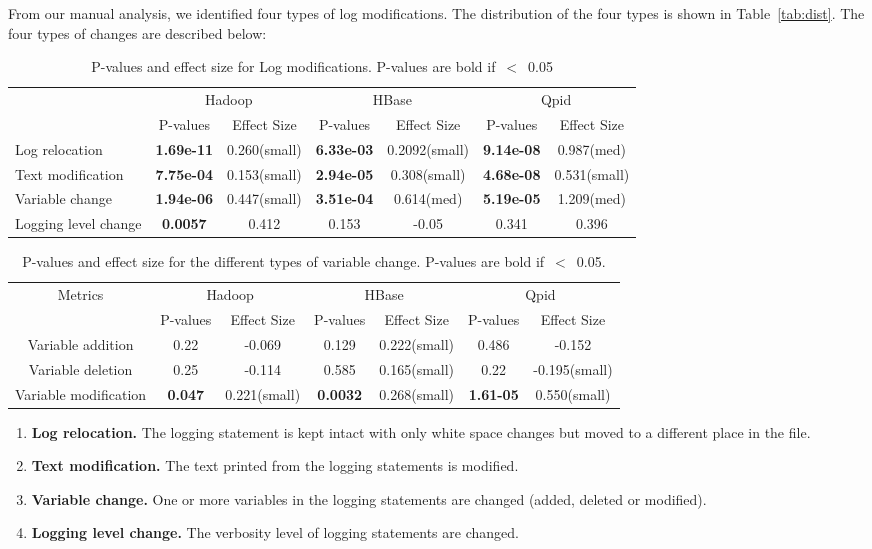\documentclass[conference]{IEEEtran}
\begin{document}
From our manual analysis, we identified four types of log modifications. The distribution of the four types is shown in Table~\ref{tab:dist}. The four types of changes are described below:
\begin{table}
	\protect\caption{P-values and effect size for Log modifications. P-values are bold if~$<$~0.05 }
	\label{tab:logmod}
	\centering{}%
	\begin{tabular}{|>{\centering}m{5cm}|c|c|c|c|c|c|}
		\hline 
		\multirow{2}{*}{Metrics}& \multicolumn{2}{c|}{Hadoop} & \multicolumn{2}{c|}{HBase} & \multicolumn{2}{c|}{Qpid}\tabularnewline
		\cline{2-7} 
		& P-values  & Effect Size & P-values  & Effect Size & P-values  & Effect Size\tabularnewline
		\hline 
		Log relocation & \textbf{1.69e-11} & 0.260(small) & \textbf{6.33e-03} & 0.2092(small) & \textbf{9.14e-08} & 0.987(med)\tabularnewline
		\hline 
		Text modification & \textbf{7.75e-04} & 0.153(small) & \textbf{2.94e-05} & 0.308(small) & \textbf{4.68e-08} & 0.531(small)\tabularnewline
		\hline 
		Variable change  & \textbf{1.94e-06} & 0.447(small) & \textbf{3.51e-04} & 0.614(med) & \textbf{5.19e-05} & 1.209(med)\tabularnewline
		\hline 
		Logging level change & \textbf{0.0057} & 0.412 & 0.153 & -0.05 & 0.341 & 0.396\tabularnewline
		\hline 
	\end{tabular}
\end{table}
\begin{table}[tbh]
	\caption{P-values and effect size for the different types of variable change. P-values are bold if~$<$~0.05.}
	\label{tab:varmod}
	\centering
	\begin{tabular}{|c|c|c|c|c|c|c|}
		\hline 
		\multirow{2}{*}{Metrics}& \multicolumn{2}{c|}{Hadoop} & \multicolumn{2}{c|}{HBase} & \multicolumn{2}{c|}{Qpid}\tabularnewline
		\cline{2-7} 
		& P-values  & Effect Size & P-values  & Effect Size & P-values  & Effect Size\tabularnewline
		\hline  Variable addition & 0.22  & -0.069  & 0.129 & 0.222(small) & 0.486 & -0.152 \\ 
		\hline  Variable deletion & 0.25 &   -0.114 & 0.585 &  0.165(small)  & 0.22 & -0.195(small)  \\ 
		\hline Variable modification & \textbf{0.047} &0.221(small)  & \textbf{0.0032} & 0.268(small) & \textbf{1.61-05} & 0.550(small)   \\ 
		\hline 
	\end{tabular} 
\end{table}
\begin{enumerate}
	\item \textbf{Log relocation.} The logging statement is kept intact with only white space changes but moved to a different place in the file.
	\item \textbf{Text modification.} The text printed from the logging statements is modified.
	\item \textbf{Variable change.} One or more variables in the logging statements are changed (added, deleted or modified).
	\item \textbf{Logging level change. } The verbosity level of logging statements are changed.
\end{enumerate}
\end{document}
